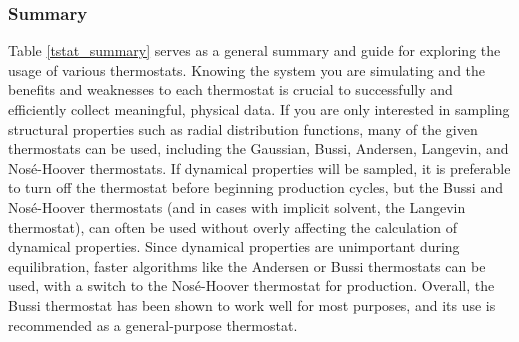 \documentclass[9pt,bestpractices]{livecoms}
\begin{document}
\subsubsection{Summary}
Table \ref{tstat_summary} serves as a general summary and guide for exploring the usage of various thermostats.
Knowing the system you are simulating and the benefits and weaknesses to each thermostat is crucial to successfully and efficiently collect meaningful, physical data.
If you are only interested in sampling structural properties such as radial distribution functions, many of the given thermostats can be used, including the Gaussian, Bussi, Andersen, Langevin, and Nos\'{e}-Hoover thermostats.
If dynamical properties will be sampled, it is preferable to turn off the thermostat before beginning production cycles, but the Bussi and Nos\'{e}-Hoover thermostats (and in cases with implicit solvent, the Langevin thermostat), can often be used without overly affecting the calculation of dynamical properties.
Since dynamical properties are unimportant during equilibration, faster algorithms like the Andersen or Bussi thermostats can be used, with a switch to the Nos\'{e}-Hoover thermostat for production.
Overall, the Bussi thermostat has been shown to work well for most purposes, and its use is recommended as a general-purpose thermostat.
\end{document}
